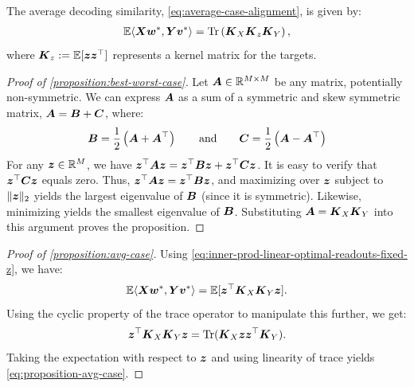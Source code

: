 \begin{proposition}
\label{proposition:avg-case}
The average decoding similarity, \cref{eq:average-case-alignment}, is given by:
\begin{align}
\label{eq:proposition-avg-case}
\mathbb{E} \langle \boldsymbol{X} \boldsymbol{w}^*, \boldsymbol{Y} \boldsymbol{v}^* \rangle =
\operatorname*{Tr} \left( \boldsymbol{K}_X \boldsymbol{K}_z \boldsymbol{K}_Y \right),
\end{align}
where $\boldsymbol{K}_z:=\mathbb{E}[\boldsymbol{z}\boldsymbol{z}^\top]$ represents a kernel matrix for the targets.
\end{proposition}

\begin{proof}[Proof of \cref{proposition:best-worst-case}]
Let $\boldsymbol{A} \in \mathbb{R}^{M \times M}$ be any matrix, potentially non-symmetric.
We can express $\boldsymbol{A}$ as a sum of a symmetric and skew symmetric matrix, $\boldsymbol{A} = \boldsymbol{B} + \boldsymbol{C}$, where:
\begin{equation}
\boldsymbol{B} = \frac{1}{2}\left ( \boldsymbol{A} + \boldsymbol{A}^\top \right) \qquad \text{and} \qquad \boldsymbol{C} = \frac{1}{2}\left ( \boldsymbol{A} - \boldsymbol{A}^\top \right)
\end{equation}
For any $\boldsymbol{z} \in \mathbb{R}^M$, we have $\boldsymbol{z}^\top \boldsymbol{A} \boldsymbol{z} = \boldsymbol{z}^\top \boldsymbol{B} \boldsymbol{z} + \boldsymbol{z}^\top \boldsymbol{C} \boldsymbol{z}$.
It is easy to verify that $\boldsymbol{z}^\top \boldsymbol{C} \boldsymbol{z}$ equals zero.
Thus, $\boldsymbol{z}^\top \boldsymbol{A} \boldsymbol{z} = \boldsymbol{z}^\top \boldsymbol{B} \boldsymbol{z}$, and maximizing over $\boldsymbol{z}$ subject to $\Vert \boldsymbol{z} \Vert_2$ yields the largest eigenvalue of $\boldsymbol{B}$ (since it is symmetric).
Likewise, minimizing yields the smallest eigenvalue of $\boldsymbol{B}$.
Substituting $\boldsymbol{A} = \boldsymbol{K}_X \boldsymbol{K}_Y$ into this argument proves the proposition.
\end{proof}

\begin{proof}[Proof of \cref{proposition:avg-case}]
Using \cref{eq:inner-prod-linear-optimal-readouts-fixed-z}, we have:
\begin{equation*} 
\mathbb{E} \langle \boldsymbol{X} \boldsymbol{w}^*, \boldsymbol{Y} \boldsymbol{v}^* \rangle = \mathbb{E} [\boldsymbol{z}^\top \boldsymbol{K}_X \boldsymbol{K}_Y \boldsymbol{z} ].
\end{equation*}
Using the cyclic property of the trace operator to manipulate this further, we get:
\begin{equation*}
\boldsymbol{z}^\top \boldsymbol{K}_X \boldsymbol{K}_Y \boldsymbol{z}  = \operatorname*{Tr}( \boldsymbol{K}_X\boldsymbol{z}\boldsymbol{z}^\top\boldsymbol{\boldsymbol{K}}_Y).
\end{equation*}
Taking the expectation with respect to $\boldsymbol{z}$ and using linearity of trace yields \cref{eq:proposition-avg-case}.
\end{proof}




